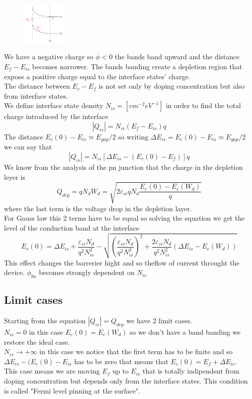 \begin{figure}
\includegraphics[width=0.19\textwidth]{is02.png}
\end{figure}

We have a negative charge so $\phi<0$ the bands band upward and the distance $E_f-E_{is}$ becomes narrower. The bands banding create a depletion region that expose a positive charge equal to the interface states' charge.\\
The distance between $E_c-E_f$ is not set only by doping concentration but also from interface states.\\
We define interface state density $N_{is} = [cm^{-2}eV^{-1}]$ in order to find the total charge introduced by the interface 
\begin{equation}
|Q_{is}|=N_{is}(E_f-E_{is})q
\end{equation}
The distance $E_c(0)-E_{is}\simeq E_{gap}/2$ so writing $\Delta E_{is}=E_c(0)-E_{is}\simeq E_{gap}/2$ we can say that
\begin{equation}
|Q_{is}|=N_{is}[\Delta E_{is}-(E_c(0)-E_{f})]q
\end{equation}
We know from the analysis of the pn junction that the charge in the depletion leyer is 
\begin{equation}
Q_{dep}=qN_dW_d=\sqrt{2\varepsilon_{si}qN_d\frac{E_c(0)-E_c(W_d)}{q}}
\end{equation}
where the last term is the voltage drop in the depletion layer.\\
For Gauss law this 2 terms have to be equal so solving the equation we get the level of the conduction band at the interface 
\begin{equation}
E_c(0)=\Delta E_{is}+\frac{\varepsilon_{si}N_d}{q^2N^2_{is}}-\sqrt{(\frac{\varepsilon_{si}N_d}{q^2N^2_{is}})^2+\frac{2\varepsilon_{si}N_d}{q^2N^2_{is}}(\Delta E_{is}-E_c(W_d))}
\end{equation}
This effect changes the barrerier hight and so theflow of current throught the device. $\phi_{bn}$ becomes strongly dependent on $N_{is}$

\subsection{Limit cases}
Starting from the equation $|Q_{is}|=Q_{dep}$ we have 2 limit cases.\\
$N_{is}=0$ in this case $E_c(0)=E_c(W_d)$ so we don't have a band banding we restore the ideal case.\\
$N_{is}\rightarrow +\infty$ in this case we notice that the first term has to be finite and so $\Delta E_{is}-(E_c(0)-E_{is}$ has to be zero that means that $E_c(0)=E_f+\Delta E_{is}$. \\
This case means we are moving $E_{f}$ up to $E_{is}$ that is totally indipendent from doping concentration but depends only from the interface states. This condition is called "Fermi level pinning at the surface".\\

